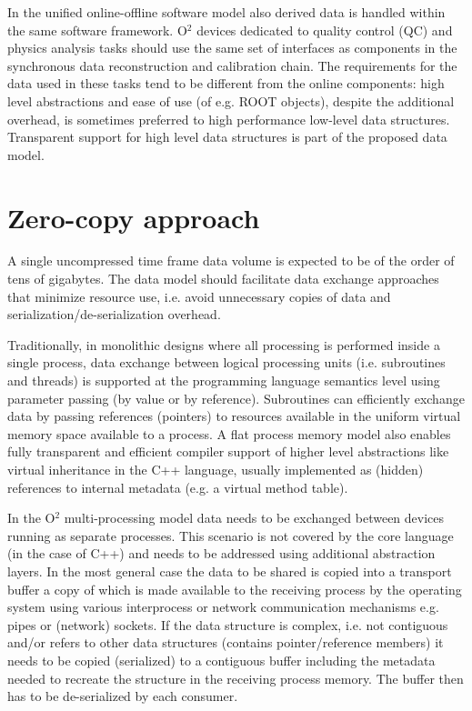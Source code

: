 \documentclass[a4paper,twoside]{article}
\def\O2{O$^2$}
\begin{document}
In the unified online-offline software model also derived data is handled within the same software framework. \O2 devices dedicated to quality control (QC) and physics analysis tasks should use the same set of interfaces as components in the synchronous data reconstruction and calibration chain. The requirements for the data used in these tasks tend to be different from the online components: high level abstractions and ease of use (of e.g. ROOT\cite{root} objects), despite the additional overhead, is sometimes preferred to high performance low-level data structures. Transparent support for high level data structures is part of the proposed data model.

\section{Zero-copy approach}

A single uncompressed time frame data volume is expected to be of the order of tens of gigabytes. The data model should facilitate data exchange approaches that minimize resource use, i.e. avoid unnecessary copies of data and serialization/de-serialization overhead.

Traditionally, in monolithic designs where all processing is performed inside a single process, data exchange between logical processing units (i.e. subroutines and threads) is supported at the programming language semantics level using parameter passing (by value or by reference).
Subroutines can efficiently exchange data by passing references (pointers) to resources available in the uniform virtual memory space available to a process.
A flat process memory model also enables fully transparent and efficient compiler support of higher level abstractions like virtual inheritance in the C++ language, usually implemented as (hidden) references to internal metadata (e.g. a virtual method table).

In the \O2 multi-processing model data needs to be exchanged between devices running as separate processes. This scenario is not covered by the core language (in the case of C++) and needs to be addressed using additional abstraction layers. In the most general case the data to be shared is copied into a transport buffer a copy of which is made available to the receiving process by the operating system using various interprocess or network communication mechanisms e.g. pipes or (network) sockets. 
If the data structure is complex, i.e. not contiguous and/or refers to other data structures (contains pointer/reference members) it needs to be copied (serialized) to a contiguous buffer including the metadata needed to recreate the structure in the receiving process memory.
The buffer then has to be de-serialized by each consumer.
\end{document}

